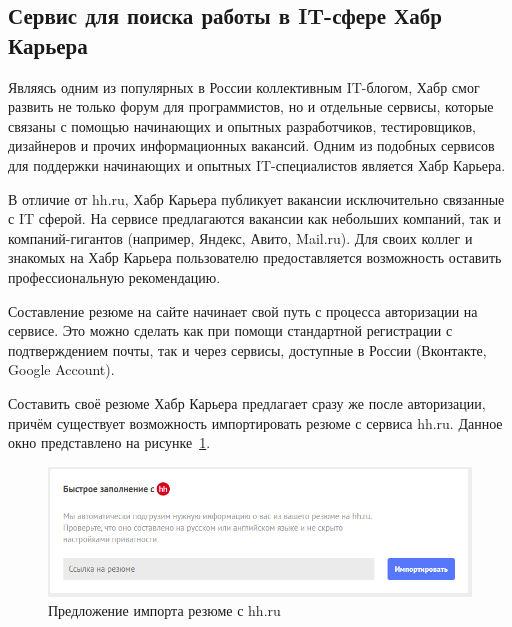 \documentclass[master, och, diploma]{SCWorks}
\begin{document}
\subsection{Сервис для поиска работы в IT-сфере Хабр Карьера}
Являясь одним из популярных в России коллективным IT-блогом, Хабр смог развить не только форум для программистов, но и отдельные сервисы, которые связаны с помощью начинающих и опытных разработчиков, тестировщиков, дизайнеров и прочих информационных вакансий. Одним из подобных сервисов для поддержки начинающих и опытных IT-специалистов является Хабр Карьера\cite{Gridneva_2021}.

В отличие от hh.ru, Хабр Карьера публикует вакансии исключительно связанные с IT сферой. На сервисе предлагаются вакансии как небольших компаний, так и компаний-гигантов (например, Яндекс, Авито, Mail.ru). Для своих коллег и знакомых на Хабр Карьера пользователю предоставляется возможность оставить профессиональную рекомендацию.

Составление резюме на сайте начинает свой путь с процесса авторизации на сервисе. Это можно сделать как при помощи стандартной регистрации с подтверждением почты, так и через сервисы, доступные в России (Вконтакте, Google Account).

Составить своё резюме Хабр Карьера предлагает сразу же после авторизации, причём существует возможность импортировать резюме с сервиса hh.ru. Данное окно представлено на рисунке~\ref{fig:5}.
\begin{figure}[!ht]
    \centering
    \includegraphics[width=12cm]{images/image9.png}
    \caption{\label{fig:5}%
        Предложение импорта резюме с hh.ru}
\end{figure}
\end{document}
